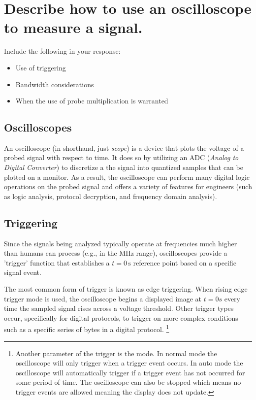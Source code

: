 \documentclass[main.tex]{subfiles}
\begin{document}
\section{Describe how to use an oscilloscope to measure a signal.}

Include the following in your response:
\begin {itemize}
    \item Use of triggering
    \item Bandwidth considerations
    \item When the use of probe multiplication is warranted
\end {itemize}

\spoilerline

\subsection{Oscilloscopes}
An oscilloscope (in shorthand, just \textit{scope}) is a device that plots the voltage of a probed signal with respect to time. It does so by utilizing an ADC (\textit{Analog to Digital Converter}) to discretize a the signal into quantized samples that can be plotted on a monitor. As a result, the oscilloscope can perform many digital logic operations on the probed signal and offers a variety of features for engineers (such as logic analysis, protocol decryption, and frequency domain analysis).

\subsection{Triggering}
Since the signals being analyzed typically operate at frequencies much higher than humans can process (e.g., in the MHz range), oscilloscopes provide a 'trigger' function that establishes a \( t = 0 \, \text{s} \) reference point based on a specific signal event. \newline

\newnoindentpara The most common form of trigger is known as edge triggering. When rising edge trigger mode is used, the oscilloscope begins a displayed image at $t=0s$ every time the sampled signal rises across a voltage threshold. Other trigger types occur, specifically for digital protocols, to trigger on more complex conditions such as a specific series of bytes in a digital protocol. \footnote {Another parameter of the trigger is the mode. In normal mode the oscilloscope will only trigger when a trigger event occurs. In auto mode the oscilloscope will automatically trigger if a trigger event has not occurred for some period of time. The oscilloscope can also be stopped which means no trigger events are allowed meaning the display does not update.} %
\end{document}
